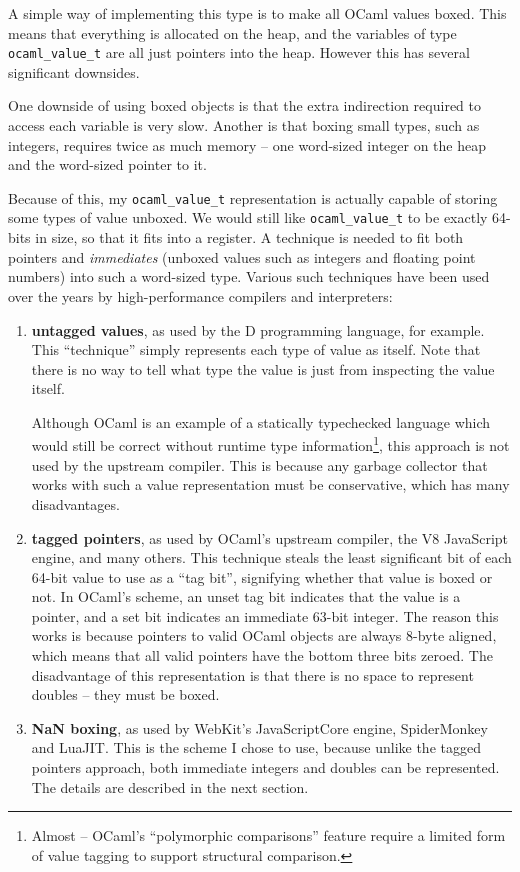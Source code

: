 \documentclass[12pt,a4paper,twoside,openright]{report}
\begin{document}
A simple way of implementing this type is to make all OCaml values boxed. This means
that everything is allocated on the heap, and the variables of type
\lstinline!ocaml_value_t! are all just pointers into the heap. However this has
several significant downsides.

One downside of using boxed objects is that the extra indirection required to
access each variable is very slow. Another is that boxing small types, such as
integers, requires twice as much memory -- one word-sized integer on the heap
and the word-sized pointer to it.

Because of this, my \lstinline!ocaml_value_t! representation is actually
capable of storing some types of value unboxed. We would still like
\lstinline!ocaml_value_t! to be exactly 64-bits in size, so that it fits into a
register. A technique is needed to fit both pointers and \textit{immediates}
(unboxed values such as integers and floating point numbers) into such a
word-sized type. Various such techniques have been used over the years by
high-performance compilers and interpreters:
\begin{enumerate}
  \item \textbf{untagged values}, as used by the D programming language, for
    example. This ``technique'' simply represents each type of value as itself.
    Note that there is no way to tell what type the value is just from inspecting the value itself.

    Although OCaml is an example of a statically typechecked language which would
    still be correct without runtime type information\footnote{Almost -- OCaml's
    ``polymorphic comparisons'' feature require a limited form of value tagging
    to support structural comparison.}, this approach is not used by the upstream
    compiler. This is because any garbage collector that works with such a
    value representation must be conservative, which has many
    disadvantages.
  \item \textbf{tagged pointers}, as used by OCaml's upstream compiler, the V8
    JavaScript engine, and many others. This technique steals the least
    significant bit of each 64-bit value to use as a ``tag bit'', signifying whether
    that value is boxed or not. In OCaml's scheme, an unset tag bit indicates
    that the value is a pointer, and a set bit indicates an immediate 63-bit integer.
    The reason this works is because pointers to valid OCaml objects are always
    8-byte aligned, which means that all valid pointers have the bottom
    three bits zeroed. The disadvantage of this representation is that there is
    no space to represent doubles -- they must be boxed.
  \item \textbf{NaN boxing}, as used by WebKit's JavaScriptCore engine,
    SpiderMonkey and LuaJIT. This is the scheme I chose to use, because unlike
    the tagged pointers approach, both immediate integers and doubles can be
    represented. The details are described in the next section.
\end{enumerate}
\end{document}
